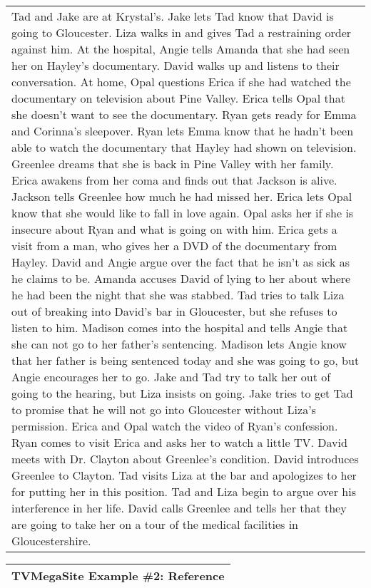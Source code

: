 \documentclass{article} \usepackage{iclr2022_conference,times}
\begin{document}
\begin{table}[!htbp]
\begin{tabular}{p{\linewidth}}
Tad and Jake are at Krystal's. Jake lets Tad know that David is going to Gloucester. Liza walks in and gives Tad a restraining order against him. At the hospital, Angie tells Amanda that she had seen her on Hayley's documentary. David walks up and listens to their conversation. At home, Opal questions Erica if she had watched the documentary on television about Pine Valley. Erica tells Opal that she doesn't want to see the documentary. Ryan gets ready for Emma and Corinna's sleepover. Ryan lets Emma know that he hadn't been able to watch the documentary that Hayley had shown on television. Greenlee dreams that she is back in Pine Valley with her family. Erica awakens from her coma and finds out that Jackson is alive. Jackson tells Greenlee how much he had missed her. Erica lets Opal know that she would like to fall in love again. Opal asks her if she is insecure about Ryan and what is going on with him. Erica gets a visit from a man, who gives her a DVD of the documentary from Hayley. David and Angie argue over the fact that he isn't as sick as he claims to be. Amanda accuses David of lying to her about where he had been the night that she was stabbed. Tad tries to talk Liza out of breaking into David's bar in Gloucester, but she refuses to listen to him. Madison comes into the hospital and tells Angie that she can not go to her father's sentencing. Madison lets Angie know that her father is being sentenced today and she was going to go, but Angie encourages her to go. Jake and Tad try to talk her out of going to the hearing, but Liza insists on going. Jake tries to get Tad to promise that he will not go into Gloucester without Liza's permission. Erica and Opal watch the video of Ryan's confession. Ryan comes to visit Erica and asks her to watch a little TV. David meets with Dr. Clayton about Greenlee's condition. David introduces Greenlee to Clayton. Tad visits Liza at the bar and apologizes to her for putting her in this position. Tad and Liza begin to argue over his interference in her life. David calls Greenlee and tells her that they are going to take her on a tour of the medical facilities in Gloucestershire.
    \\
    \end{tabular}
    \begin{tabular}{p{\linewidth}} 
    \midrule
    \textbf{TVMegaSite Example \#2: Reference} \\
    \midrule

\end{tabular}
\end{table}
\end{document}
